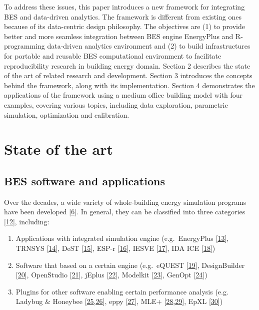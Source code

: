 \documentclass[3p, times]{elsarticle} %
\providecommand{\tightlist}{%
  \setlength{\itemsep}{0pt}\setlength{\parskip}{0pt}}
\begin{document}
To address these issues, this paper introduces a new framework for integrating
BES and data-driven analytics. The framework is different from existing ones
because of its data-centric design philosophy. The objectives are (1) to provide
better and more seamless integration between BES engine EnergyPlus and
R-programming data-driven analytics environment and (2) to build infrastructures
for portable and reusable BES computational environment to facilitate
reproducibility research in building energy domain. Section 2 describes the
state of the art of related research and development. Section 3 introduces the
concepts behind the framework, along with its implementation. Section 4
demonstrates the applications of the framework using a medium office building
model with four examples, covering various topics, including data exploration,
parametric simulation, optimization and calibration.

\hypertarget{state-of-the-art}{%
\section{State of the art}\label{state-of-the-art}}

\hypertarget{bes-software-and-applications}{%
\subsection{BES software and applications}\label{bes-software-and-applications}}

Over the decades, a wide variety of whole-building energy simulation programs
have been developed {[}\protect\hyperlink{ref-Crawley2008a}{6}{]}. In general, they can be classified into
three categories {[}\protect\hyperlink{ref-Ostergard2016}{12}{]}, including:

\begin{enumerate}
\def\labelenumi{\arabic{enumi}.}
\tightlist
\item
  Applications with integrated simulation engine (e.g.~EnergyPlus
  {[}\protect\hyperlink{ref-Crawley2001}{13}{]}, TRNSYS {[}\protect\hyperlink{ref-Beckman1994}{14}{]}, DeST {[}\protect\hyperlink{ref-Yan2008}{15}{]}, ESP-r {[}\protect\hyperlink{ref-Hand2018}{16}{]},
  IESVE {[}\protect\hyperlink{ref-IntegratedEnvironmentalSolutionsLimited2020}{17}{]}, IDA ICE
  {[}\protect\hyperlink{ref-Kalamees2004}{18}{]})
\item
  Software that based on a certain engine (e.g.~eQUEST {[}\protect\hyperlink{ref-Hirsch2020}{19}{]},
  DesignBuilder {[}\protect\hyperlink{ref-DesignBuilderSoftwareLtd2020a}{20}{]}, OpenStudio
  {[}\protect\hyperlink{ref-Guglielmetti2011}{21}{]}, jEplus {[}\protect\hyperlink{ref-Yi2020}{22}{]}, Modelkit {[}\protect\hyperlink{ref-BigLadderSoftware2020}{23}{]},
  GenOpt {[}\protect\hyperlink{ref-Wetter2001}{24}{]})
\item
  Plugins for other software enabling certain performance analysis (e.g.
  Ladybug \& Honeybee {[}\protect\hyperlink{ref-Roudsari2013}{25},\protect\hyperlink{ref-Tabadkani2019}{26}{]}, eppy {[}\protect\hyperlink{ref-Philip2020}{27}{]}, MLE+
  {[}\protect\hyperlink{ref-Bernal2012}{28},\protect\hyperlink{ref-Zhao2013b}{29}{]}, EpXL {[}\protect\hyperlink{ref-Schild2020}{30}{]})
\end{enumerate}
\end{document}
